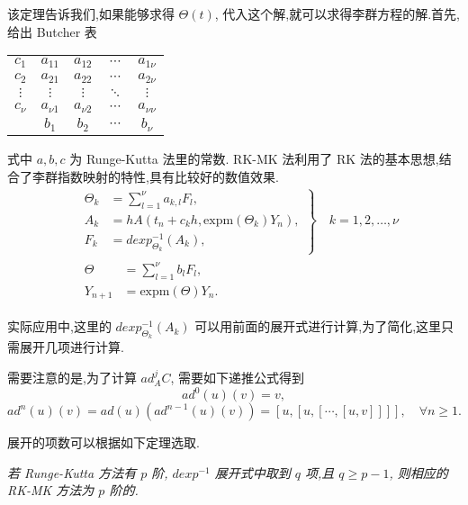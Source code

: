 该定理告诉我们,如果能够求得 $\Theta(t)$, 代入这个解,就可以求得李群方程的解.首先,给出 Butcher 表
\begin{center}
  \begin{tabular}{c|cccc}
    $c_1$&$a_{11}$&$a_{12}$&$\cdots$&$a_{1\nu}$\\
    $c_2$&$a_{21}$&$a_{22}$&$\cdots$&$a_{2\nu}$\\
    $\vdots$&$\vdots$&$\vdots$&$\ddots$&$\vdots$\\
    $c_{\nu}$&$a_{\nu 1}$&$a_{\nu 2}$&$\cdots$&$a_{\nu \nu}$\\
    \hline
         &$b_{1}$&$b_{2}$&$\cdots$&$b_{\nu}$
  \end{tabular}
\end{center}
式中 $a,b,c$ 为 Runge-Kutta 法里的常数. RK-MK 法利用了 RK 法的基本思想,结合了李群指数映射的特性,具有比较好的数值效果.
\begin{equation*}
	\begin{aligned}
		&\left.\begin{aligned}
		\Theta_k&=\sum_{l=1}^{\nu}a_{k,l}F_l,\\
		A_k&=hA(t_n+c_kh,\mbox{expm}(\Theta_k)Y_n),\\
		F_k&=dexp_{\Theta_k}^{-1}(A_k),
	\end{aligned}\right\rbrace \quad k=1,2,\ldots,\nu\\
		&\begin{aligned}
		\Theta&=\sum_{l=1}^{\nu}b_lF_l,\\
		Y_{n+1}&=\mbox{expm}(\Theta)Y_n.
	\end{aligned}
	\end{aligned}
\end{equation*}

实际应用中,这里的 $dexp_{\Theta_k}^{-1}(A_k)$ 可以用前面的展开式进行计算,为了简化,这里只需展开几项进行计算.

需要注意的是,为了计算 $ad^j_AC$, 需要如下递推公式得到
\begin{equation*}
	ad^0(u)(v)=v,
\end{equation*}
\begin{equation*}
	ad^n(u)(v)=ad(u)(ad^{n-1}(u)(v))=[u,[u,[\cdots,[u,v]]]],\quad \forall n \geq 1.
\end{equation*}

展开的项数可以根据如下定理选取.
\begin{theorem}
	\emph{若 Runge-Kutta 方法有 $p$ 阶, $dexp^{-1}$ 展开式中取到 $q$ 项,且 $q\geq p-1$, 则相应的 RK-MK 方法为 $p$ 阶的.}
\end{theorem}

